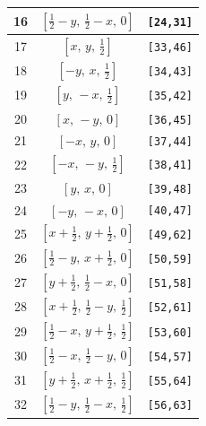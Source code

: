 \documentclass[fleqn,8pt]{jsarticle}
\begin{document}
\begin{longtable}{ccc}
16 & $\left[ \frac{1}{2} - y,\, \frac{1}{2} - x,\, 0 \right]$ & {\tt [24,31]} \\ \hline
17 & $\left[ x,\, y,\, \frac{1}{2} \right]$ & {\tt [33,46]} \\ \hline
18 & $\left[ - y,\, x,\, \frac{1}{2} \right]$ & {\tt [34,43]} \\ \hline
19 & $\left[ y,\, - x,\, \frac{1}{2} \right]$ & {\tt [35,42]} \\ \hline
20 & $\left[ x,\, - y,\, 0 \right]$ & {\tt [36,45]} \\ \hline
21 & $\left[ - x,\, y,\, 0 \right]$ & {\tt [37,44]} \\ \hline
22 & $\left[ - x,\, - y,\, \frac{1}{2} \right]$ & {\tt [38,41]} \\ \hline
23 & $\left[ y,\, x,\, 0 \right]$ & {\tt [39,48]} \\ \hline
24 & $\left[ - y,\, - x,\, 0 \right]$ & {\tt [40,47]} \\ \hline
25 & $\left[ x + \frac{1}{2},\, y + \frac{1}{2},\, 0 \right]$ & {\tt [49,62]} \\ \hline
26 & $\left[ \frac{1}{2} - y,\, x + \frac{1}{2},\, 0 \right]$ & {\tt [50,59]} \\ \hline
27 & $\left[ y + \frac{1}{2},\, \frac{1}{2} - x,\, 0 \right]$ & {\tt [51,58]} \\ \hline
28 & $\left[ x + \frac{1}{2},\, \frac{1}{2} - y,\, \frac{1}{2} \right]$ & {\tt [52,61]} \\ \hline
29 & $\left[ \frac{1}{2} - x,\, y + \frac{1}{2},\, \frac{1}{2} \right]$ & {\tt [53,60]} \\ \hline
30 & $\left[ \frac{1}{2} - x,\, \frac{1}{2} - y,\, 0 \right]$ & {\tt [54,57]} \\ \hline
31 & $\left[ y + \frac{1}{2},\, x + \frac{1}{2},\, \frac{1}{2} \right]$ & {\tt [55,64]} \\ \hline
32 & $\left[ \frac{1}{2} - y,\, \frac{1}{2} - x,\, \frac{1}{2} \right]$ & {\tt [56,63]} \\
\end{longtable}
\renewcommand{\arraystretch}{1.2}
\end{document}
